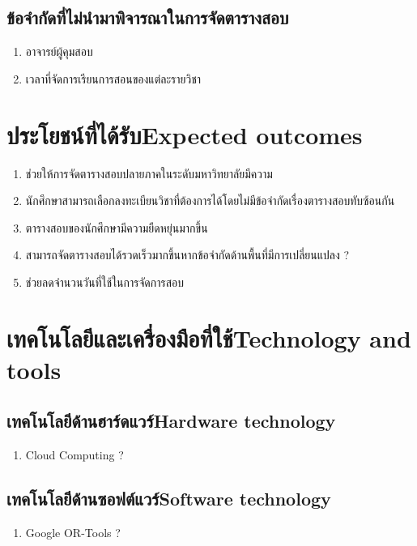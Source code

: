 \subsection{ข้อจำกัดที่ไม่นำมาพิจารณาในการจัดตารางสอบ}
\begin{enumerate}
    \item อาจารย์ผู้คุมสอบ
    \item เวลาที่จัดการเรียนการสอนของแต่ละรายวิชา
\end{enumerate}

\section{\ifcpe ประโยชน์ที่ได้รับ\else Expected outcomes\fi}
\begin{enumerate}
    \item ช่วยให้การจัดตารางสอบปลายภาคในระดับมหาวิทยาลัยมีความ
    \item นักศึกษาสามารถเลือกลงทะเบียนวิชาที่ต้องการได้โดยไม่มีข้อจำกัดเรื่องตารางสอบทับซ้อนกัน
    \item ตารางสอบของนักศึกษามีความยืดหยุ่นมากขึ้น
    \item สามารถจัดตารางสอบได้รวดเร็วมากขึ้นหากข้อจำกัดด้านพื้นที่มีการเปลี่ยนแปลง ?
    \item ช่วยลดจำนวนวันที่ใช้ในการจัดการสอบ
\end{enumerate}

\section{\ifcpe เทคโนโลยีและเครื่องมือที่ใช้\else Technology and tools\fi}

\subsection{\ifcpe เทคโนโลยีด้านฮาร์ดแวร์\else Hardware technology\fi}
\begin{enumerate}
    \item Cloud Computing ?
\end{enumerate}
\subsection{\ifcpe เทคโนโลยีด้านซอฟต์แวร์\else Software technology\fi}
\begin{enumerate}
    \item Google OR-Tools ?
\end{enumerate}

